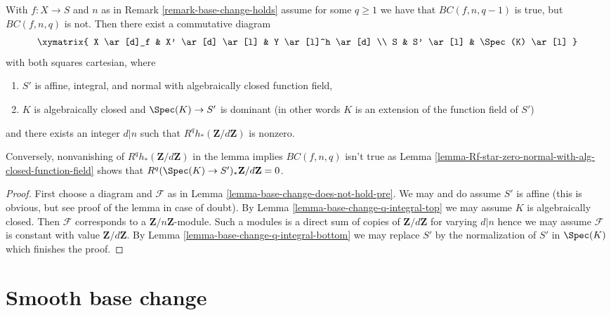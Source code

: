 \begin{lemma}
\label{lemma-base-change-does-not-hold}
With $f : X \to S$ and $n$ as in Remark \ref{remark-base-change-holds}
assume for some $q \geq 1$ we have that
$BC(f, n, q - 1)$ is true, but $BC(f, n, q)$ is not.
Then there exist a commutative diagram
$$
\xymatrix{
X \ar[d]_f & X' \ar[d] \ar[l] & Y \ar[l]^h \ar[d] \\
S & S' \ar[l] & \Spec(K) \ar[l]
}
$$
with both squares cartesian, where
\begin{enumerate}
\item $S'$ is affine, integral, and normal with algebraically
closed function field,
\item $K$ is algebraically closed and $\Spec(K) \to S'$
is dominant (in other words $K$ is an extension of
the function field of $S'$)
\end{enumerate}
and there exists an integer $d | n$
such that $R^qh_*(\mathbf{Z}/d\mathbf{Z})$ is nonzero.
\end{lemma}

\noindent
Conversely, nonvanishing of $R^qh_*(\mathbf{Z}/d\mathbf{Z})$
in the lemma implies $BC(f, n, q)$ isn't true as
Lemma \ref{lemma-Rf-star-zero-normal-with-alg-closed-function-field}
shows that $R^q(\Spec(K) \to S')_*\mathbf{Z}/d\mathbf{Z} = 0$.

\begin{proof}
First choose a diagram and $\mathcal{F}$ as in
Lemma \ref{lemma-base-change-does-not-hold-pre}.
We may and do assume $S'$ is affine (this is obvious, but
see proof of the lemma in case of doubt).
By Lemma \ref{lemma-base-change-q-integral-top}
we may assume $K$ is algebraically closed.
Then $\mathcal{F}$ corresponds to a $\mathbf{Z}/n\mathbf{Z}$-module.
Such a modules is a direct sum of copies of $\mathbf{Z}/d\mathbf{Z}$
for varying $d | n$ hence we may assume $\mathcal{F}$ is
constant with value $\mathbf{Z}/d\mathbf{Z}$.
By Lemma \ref{lemma-base-change-q-integral-bottom}
we may replace $S'$ by the normalization
of $S'$ in $\Spec(K)$ which finishes the proof.
\end{proof}










\section{Smooth base change}
\label{section-smooth-base-change}

